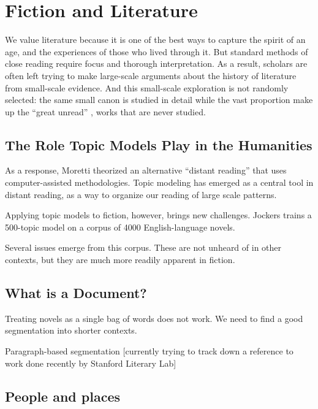 
\chapter{Fiction and Literature}

\label{ch:fiction}

We value literature because it is one of the best ways to capture the spirit of an age, and the experiences of those who lived through it. But standard methods of close reading require focus and thorough interpretation. As a result, scholars are often left trying to make large-scale arguments about the history of literature from small-scale evidence. And this small-scale exploration is not randomly selected: the same small canon is studied in detail while the vast proportion make up the ``great unread'' \citep{moretti-00}, works that are never studied.

\section{The Role Topic Models Play in the Humanities}

As a response, Moretti theorized an alternative ``distant reading''  \citep{moretti-13} that uses computer-assisted methodologies. Topic modeling has emerged as a central tool in distant reading, as a way to organize our reading of large scale patterns.

Applying topic models to fiction, however, brings new challenges. Jockers \citep{jockers-13} trains a 500-topic model on a corpus of 4000 English-language novels.

Several issues emerge from this corpus. These are not unheard of in other contexts, but they are much more readily apparent in fiction.

\section{What is a Document?}

 Treating novels as a single bag of words does not work. We need to find a good segmentation into shorter contexts.

Paragraph-based segmentation [currently trying to track down a reference to work done recently by Stanford Literary Lab]


\section{People and places}

